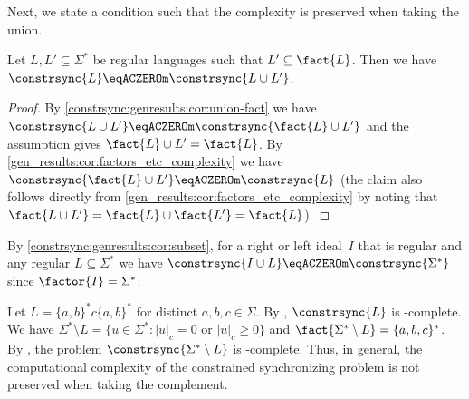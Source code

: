 Next, we state a condition such that the complexity is preserved when taking the union.

\begin{corollary} \label{constrsync:genresults:cor:subset}
	Let $L, L' \subseteq \Sigma^*$ be regular languages
	such that $L' \subseteq \fact{L}$.
	Then we have $\constrsync{L} \eqACZEROm \constrsync{L\cup L'}$.
\end{corollary}
\begin{proof}
	By \cref{constrsync:genresults:cor:union-fact}
	we have $\constrsync{L\cup L'} \eqACZEROm \constrsync{\fact{L} \cup L'}$
	and the assumption gives $\fact{L} \cup L' = \fact{L}$.
	By  \cref{gen_results:cor:factors_etc_complexity}
	we have $\constrsync{\fact{L} \cup L'} \eqACZEROm \constrsync{L}$ (the claim
	also follows directly from \cref{gen_results:cor:factors_etc_complexity}
	by noting that $\fact{L \cup L'} = \fact{L} \cup \fact{L'} = \fact{L}$).
\end{proof}

By \cref{constrsync:genresults:cor:subset}, for a right or left ideal~$I$ that is regular
and any regular $L \subseteq \Sigma^*$
we have $\constrsync{I \cup L} \eqACZEROm \constrsync{\Sigma^*}$
since $\factor{I} = \Sigma^*$.

\begin{remark}
	Let $L = \{a,b\}^* c \{a,b\}^*$ for distinct $a,b,c\in \Sigma$. 
	By , $\constrsync{L}$
	is \PSPACE-complete. We have $\Sigma^* \setminus L = \{ u \in \Sigma^* : |u|_c = 0 \text{ or } |u|_c \ge 0 \}$
	and $\fact{\Sigma^* \setminus L} = \{a,b,c\}^*$.
	By , the problem
	$\constrsync{\Sigma^* \setminus L}$ is \NL-complete.
	Thus, in general, the computational complexity of the constrained synchronizing problem
	is not preserved when taking the complement.
\end{remark} 